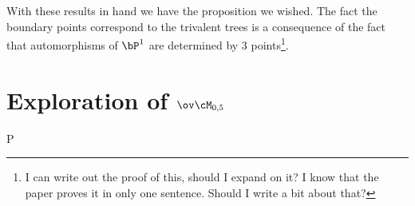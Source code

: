 \documentclass[12pt]{memoir}
\def\nextra {P}
\begin{document}
With these results in hand we have the proposition we wished. The fact the boundary points correspond to the trivalent trees is a consequence of the fact that automorphisms of $\bP^1$ are determined by $3$ points\footnote{I can write out the proof of this, should I expand on it? I know that the paper proves it in only one sentence. Should I write a bit about that?}.

\section{Exploration of $\ov\cM_{0,5}$}


\ifx\nextra\undefined
\printindex
\else\fi
\nocite{*}


\end{document}
